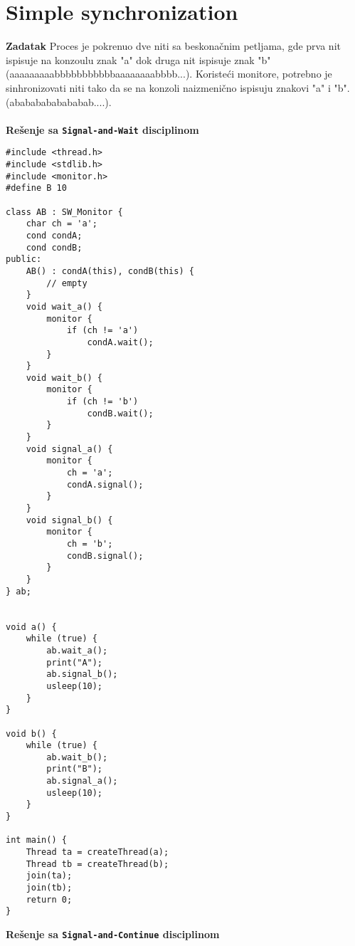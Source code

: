\clearpage
\section{Simple synchronization}
\textbf{\large Zadatak} Proces je pokrenuo dve niti sa beskona\v{c}nim petljama, gde prva nit ispisuje na konzoulu znak "a" dok druga nit ispisuje znak "b" (aaaaaaaaabbbbbbbbbbbaaaaaaaabbbb...). Koriste\'{c}i monitore, potrebno je sinhronizovati niti tako da se na konzoli naizmeni\v{c}no ispisuju znakovi "a" i "b". (abababababababab....).
\\\\
\textbf{Re\v{s}enje sa \texttt{Signal-and-Wait} disciplinom}
\begin{lstlisting}
#include <thread.h>
#include <stdlib.h>
#include <monitor.h>
#define B 10

class AB : SW_Monitor {
    char ch = 'a';
    cond condA;
    cond condB;
public:
    AB() : condA(this), condB(this) {
        // empty
    }
    void wait_a() {
        monitor {
            if (ch != 'a')
                condA.wait();
        }
    }
    void wait_b() {
        monitor {
            if (ch != 'b')
                condB.wait();
        }
    }
    void signal_a() {
        monitor {
            ch = 'a';
            condA.signal();
        }
    }
    void signal_b() {
        monitor {
            ch = 'b';
            condB.signal();
        }
    }
} ab;


void a() {
    while (true) {
        ab.wait_a();
        print("A");
        ab.signal_b();
        usleep(10);
    }
}

void b() {
    while (true) {
        ab.wait_b();
        print("B");
        ab.signal_a();
        usleep(10);
    }
}

int main() {
    Thread ta = createThread(a);
    Thread tb = createThread(b);
    join(ta);
    join(tb);
    return 0;
}

\end{lstlisting}
\textbf{Re\v{s}enje sa \texttt{Signal-and-Continue} disciplinom}
